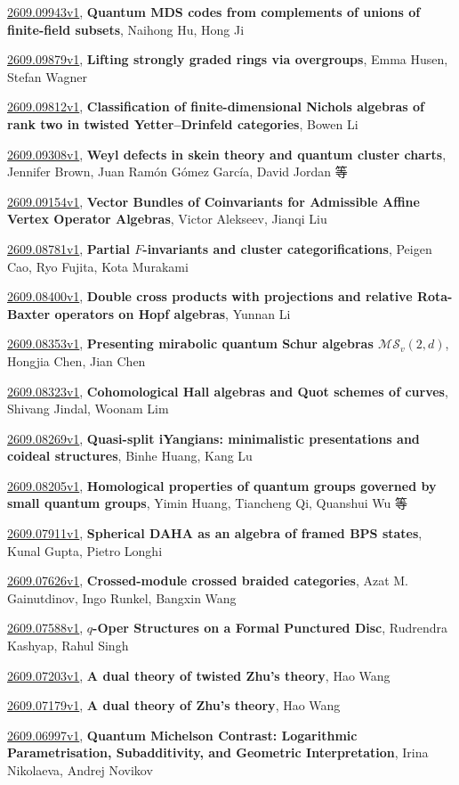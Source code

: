 \documentclass[9pt, a4paper]{article}
\theoremstyle{plain}
\theoremstyle{definition}
\theoremstyle{remark}
\newcommand{\arxiv}[3]{\href{https://arxiv.org/abs/#1}{#1}, \textbf{\textcolor{arxivblue}{#2}}, #3}
\begin{document}
\arxiv{2609.09943v1}{Quantum MDS codes from complements of unions of finite-field subsets}{Naihong Hu, Hong Ji}

\arxiv{2609.09879v1}{Lifting strongly graded rings via overgroups}{Emma Husen, Stefan Wagner}

\arxiv{2609.09812v1}{Classification of finite-dimensional Nichols algebras of rank two in twisted Yetter--Drinfeld categories}{Bowen Li}

\arxiv{2609.09308v1}{Weyl defects in skein theory and quantum cluster charts}{Jennifer Brown, Juan Ramón Gómez García, David Jordan 等}

\arxiv{2609.09154v1}{Vector Bundles of Coinvariants for Admissible Affine Vertex Operator Algebras}{Victor Alekseev, Jianqi Liu}

\arxiv{2609.08781v1}{Partial $F$-invariants and cluster categorifications}{Peigen Cao, Ryo Fujita, Kota Murakami}

\arxiv{2609.08400v1}{Double cross products with projections and relative Rota-Baxter operators on Hopf algebras}{Yunnan Li}

\arxiv{2609.08353v1}{Presenting mirabolic quantum Schur algebras $\mathcal{MS}_v(2,d)$}{Hongjia Chen, Jian Chen}

\arxiv{2609.08323v1}{Cohomological Hall algebras and Quot schemes of curves}{Shivang Jindal, Woonam Lim}

\arxiv{2609.08269v1}{Quasi-split iYangians: minimalistic presentations and coideal structures}{Binhe Huang, Kang Lu}

\arxiv{2609.08205v1}{Homological properties of quantum groups governed by small quantum groups}{Yimin Huang, Tiancheng Qi, Quanshui Wu 等}

\arxiv{2609.07911v1}{Spherical DAHA as an algebra of framed BPS states}{Kunal Gupta, Pietro Longhi}

\arxiv{2609.07626v1}{Crossed-module crossed braided categories}{Azat M. Gainutdinov, Ingo Runkel, Bangxin Wang}

\arxiv{2609.07588v1}{$q$-Oper Structures on a Formal Punctured Disc}{Rudrendra Kashyap, Rahul Singh}

\arxiv{2609.07203v1}{A dual theory of twisted Zhu's theory}{Hao Wang}

\arxiv{2609.07179v1}{A dual theory of Zhu's theory}{Hao Wang}

\arxiv{2609.06997v1}{Quantum Michelson Contrast: Logarithmic Parametrisation, Subadditivity, and Geometric Interpretation}{Irina Nikolaeva, Andrej Novikov}

\end{document}
